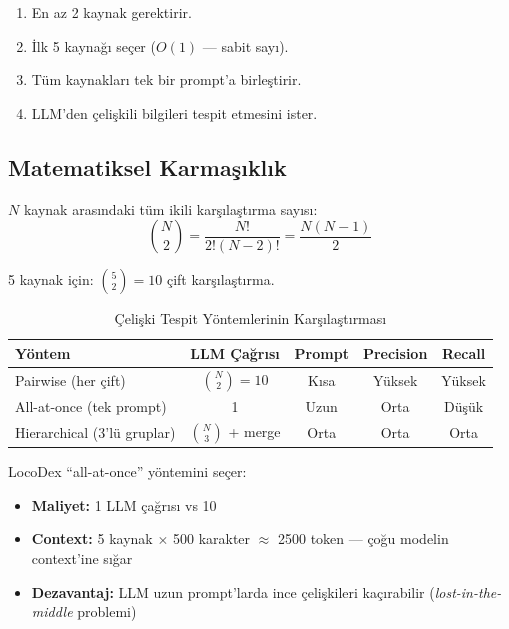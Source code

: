 \begin{enumerate}
  \item En az 2 kaynak gerektirir.
  \item \.{I}lk 5 kayna\u{g}{\i} se\c{c}er ($O(1)$ --- sabit say{\i}).
  \item T\"{u}m kaynaklar{\i} tek bir prompt'a birle\c{s}tirir.
  \item LLM'den \c{c}eli\c{s}kili bilgileri tespit etmesini ister.
\end{enumerate}

\subsection{Matematiksel Karma\c{s}{\i}kl{\i}k}

$N$ kaynak aras{\i}ndaki t\"{u}m ikili kar\c{s}{\i}la\c{s}t{\i}rma say{\i}s{\i}:
\begin{equation}
\label{eq:pairwise}
\binom{N}{2} = \frac{N!}{2!(N-2)!} = \frac{N(N-1)}{2}
\end{equation}

5 kaynak i\c{c}in: $\binom{5}{2} = 10$ \c{c}ift kar\c{s}{\i}la\c{s}t{\i}rma.

\begin{table}[H]
\centering
\caption{\c{C}eli\c{s}ki Tespit Y\"{o}ntemlerinin Kar\c{s}{\i}la\c{s}t{\i}rmas{\i}}
\label{tab:conflict-methods}
\begin{tabularx}{\textwidth}{lcccc}
\toprule
\color{chapterBlue}\textbf{Y\"{o}ntem} & \color{chapterBlue}\textbf{LLM \c{C}a\u{g}r{\i}s{\i}} & \color{chapterBlue}\textbf{Prompt} & \color{chapterBlue}\textbf{Precision} & \color{chapterBlue}\textbf{Recall} \\
\midrule
Pairwise (her \c{c}ift)  & $\binom{N}{2}=10$ & K{\i}sa   & Y\"{u}ksek & Y\"{u}ksek \\
All-at-once (tek prompt) & 1                  & Uzun    & Orta     & D\"{u}\c{s}\"{u}k \\
Hierarchical (3'l\"{u} gruplar) & $\binom{N}{3}$ + merge & Orta & Orta & Orta \\
\bottomrule
\end{tabularx}
\end{table}

LocoDex ``all-at-once'' y\"{o}ntemini se\c{c}er:
\begin{itemize}
  \item \textbf{Maliyet:} 1 LLM \c{c}a\u{g}r{\i}s{\i} vs 10
  \item \textbf{Context:} 5 kaynak $\times$ 500 karakter $\approx$ 2500 token --- \c{c}o\u{g}u modelin context'ine s{\i}\u{g}ar
  \item \textbf{Dezavantaj:} LLM uzun prompt'larda ince \c{c}eli\c{s}kileri ka\c{c}{\i}rabilir (\emph{lost-in-the-middle} problemi)
\end{itemize}


